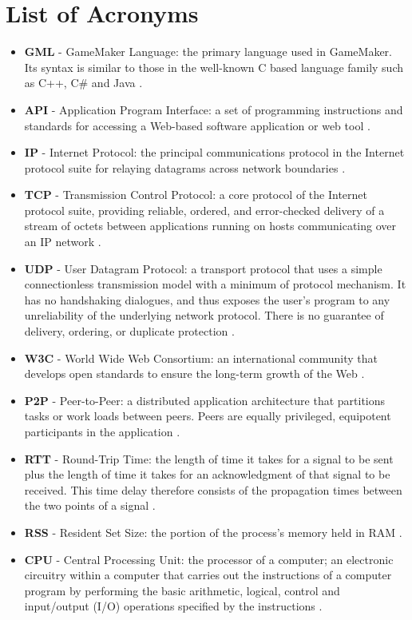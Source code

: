\documentclass[bsc, 12pt, twoside, singlespacing, parskip, abbrevs, notimes, normalheadings, logo, deptreport]{styles/infthesis}
\begin{document}
\section*{List of Acronyms}
\begin{itemize}
\item \textbf{GML} - GameMaker Language: the primary language used in GameMaker. Its syntax is similar to those in the well-known C based language family such as C++, C\# and Java \cite{def_GML}.
\item \textbf{API} - Application Program Interface: a set of programming instructions and standards for accessing a Web-based software application or web tool \cite{def_API}.
\item \textbf{IP} - Internet Protocol: the principal communications protocol in the Internet protocol suite for relaying datagrams across network boundaries \cite{def_IP}.
\item \textbf{TCP} - Transmission Control Protocol: a core protocol of the Internet protocol suite, providing reliable, ordered, and error-checked delivery of a stream of octets between applications running on hosts communicating over an IP network \cite{def_TCP}.
\item \textbf{UDP} - User Datagram Protocol: a transport protocol that uses a simple connectionless transmission model with a minimum of protocol mechanism. It has no handshaking dialogues, and thus exposes the user's program to any unreliability of the underlying network protocol. There is no guarantee of delivery, ordering, or duplicate protection \cite{def_UDP}.
\item \textbf{W3C} - World Wide Web Consortium: an international community that develops open standards to ensure the long-term growth of the Web \cite{def_W3C}.
\item \textbf{P2P} - Peer-to-Peer: a distributed application architecture that partitions tasks or work loads between peers. Peers are equally privileged, equipotent participants in the application \cite{def_P2P}.
\item \textbf{RTT} - Round-Trip Time: the length of time it takes for a signal to be sent plus the length of time it takes for an acknowledgment of that signal to be received. This time delay therefore consists of the propagation times between the two points of a signal \cite{def_RTT}.
\item \textbf{RSS} - Resident Set Size: the portion of the process's memory held in RAM \cite{def_RSS}.
\item \textbf{CPU} - Central Processing Unit: the processor of a computer; an electronic circuitry within a computer that carries out the instructions of a computer program by performing the basic arithmetic, logical, control and input/output (I/O) operations specified by the instructions \cite{def_CPU}.

\end{itemize}
\end{document}
